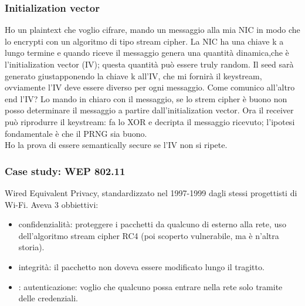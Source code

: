 \documentclass[16px]{article}
\begin{document}
\subsubsection{Initialization vector}
Ho un plaintext che voglio cifrare, mando un messaggio alla mia NIC in modo che lo encrypti con un algoritmo di tipo stream cipher. La NIC ha una chiave k a lungo termine e quando riceve il messaggio genera una quantità dinamica,che è l'initialization vector (IV); questa quantità può essere truly random. Il seed sarà generato giustapponendo la chiave k all'IV, che mi fornirà il keystream, ovviamente l'IV deve essere diverso per ogni messaggio. Come comunico all'altro end l'IV? Lo mando in chiaro con il messaggio, se lo strem cipher è buono non posso determinare il messaggio a partire dall'initialization vector. Ora il receiver può riprodurre il keystream: fa lo XOR e decripta il messaggio ricevuto; l'ipotesi fondamentale è che il PRNG sia buono.\\ Ho la prova di essere semantically secure se l'IV non si ripete.
\subsubsection{Case study: WEP 802.11}
Wired Equivalent Privacy, standardizzato nel 1997-1999 dagli stessi progettisti di Wi-Fi. Aveva 3 obbiettivi:
\begin{itemize}
\item confidenzialità: proteggere i pacchetti da qualcuno di esterno alla rete, uso dell'algoritmo stream cipher RC4 (poi scoperto vulnerabile, ma è n'altra storia).
\item integrità: il pacchetto non doveva essere modificato lungo il tragitto.
\item: autenticazione: voglio che qualcuno possa entrare nella rete solo tramite delle credenziali.
\end{itemize}
\end{document}
